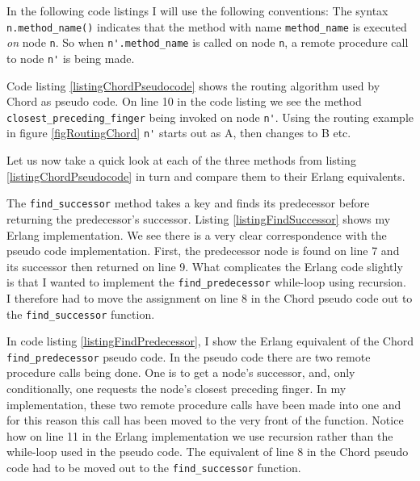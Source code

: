 In the following code listings I will use the following conventions:
The syntax \verb=n.method_name()= indicates that the method with name \verb=method_name= is executed \emph{on} node \verb=n=. So when \verb=n'.method_name= is called on node \verb=n=, a remote procedure call to node \verb=n'= is being made.

Code listing \ref{listingChordPseudocode} shows the routing algorithm used by Chord as pseudo code. On line 10 in the code listing we see the method \verb=closest_preceding_finger= being invoked on node \verb=n'=. Using the routing example in figure \ref{figRoutingChord} \verb=n'= starts out as A, then changes to B etc.

\newpage



Let us now take a quick look at each of the three methods from listing \ref{listingChordPseudocode} in turn and compare them to their Erlang equivalents.

The \verb=find_successor= method takes a key and finds its predecessor before returning the predecessor's successor.
Listing \ref{listingFindSuccessor} shows my Erlang implementation.
We see there is a very clear correspondence with the pseudo code implementation. First, the predecessor node is found on line 7 and its successor then returned on line 9.
What complicates the Erlang code slightly is that I wanted to implement the \verb=find_predecessor= while-loop using recursion. I therefore had to move the assignment on line 8 in the Chord pseudo code out to the \verb=find_successor= function.



In code listing \ref{listingFindPredecessor}, I show the Erlang equivalent of the Chord \verb=find_predecessor= pseudo code. 
In the pseudo code there are two remote procedure calls being done. One is to get a node's successor, and, only conditionally, one requests the node's closest preceding finger.
In my implementation, these two remote procedure calls have been made into one and for this reason this call has been moved to the very front of the function.
Notice how on line 11 in the Erlang implementation we use recursion rather than the while-loop used in the pseudo code. The equivalent of line 8 in the Chord pseudo code had to be moved out to the \verb=find_successor= function.

